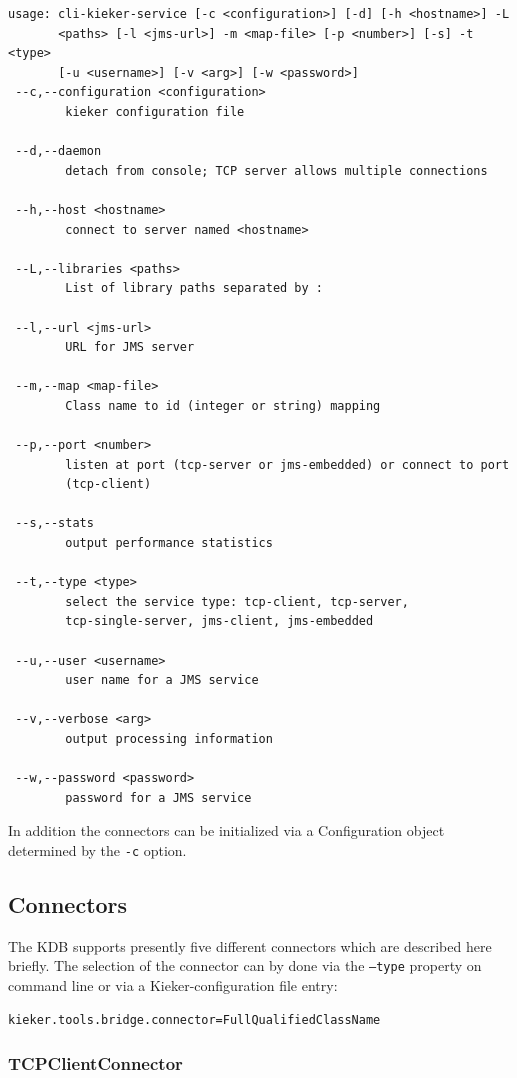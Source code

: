 \documentclass[11pt,a4paper]{article}
\begin{document}
\begin{lstlisting}[caption=Command line options of the Kieker Data Bridge]
usage: cli-kieker-service [-c <configuration>] [-d] [-h <hostname>] -L
       <paths> [-l <jms-url>] -m <map-file> [-p <number>] [-s] -t <type>
       [-u <username>] [-v <arg>] [-w <password>]
 --c,--configuration <configuration>
        kieker configuration file

 --d,--daemon
        detach from console; TCP server allows multiple connections

 --h,--host <hostname>
        connect to server named <hostname>

 --L,--libraries <paths>
        List of library paths separated by :

 --l,--url <jms-url>
        URL for JMS server

 --m,--map <map-file>
        Class name to id (integer or string) mapping

 --p,--port <number>
        listen at port (tcp-server or jms-embedded) or connect to port
        (tcp-client)

 --s,--stats
        output performance statistics

 --t,--type <type>
        select the service type: tcp-client, tcp-server,
        tcp-single-server, jms-client, jms-embedded

 --u,--user <username>
        user name for a JMS service

 --v,--verbose <arg>
        output processing information

 --w,--password <password>
        password for a JMS service
\end{lstlisting}

In addition the connectors can be initialized via a Configuration object determined by the \texttt{-c} option.

%
\subsection{Connectors}

The KDB supports presently five different connectors which are described here briefly. The selection of the connector can by done via the \texttt{--type} property on command line or via a Kieker-configuration file entry:

\begin{verbatim}
kieker.tools.bridge.connector=FullQualifiedClassName
\end{verbatim}

%
\subsubsection{TCPClientConnector}
\end{document}
